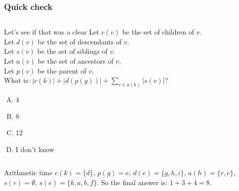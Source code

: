 \begin{frame}
	\frametitle{Quick check}
	
	\begin{columns}
		\pause
			\begin{block}{Let's see if that was a clear}
				Let $c(v)$ be the set of children of $v$.\\
				Let $d(v)$ be the set of descendants of $v$.\\
				Let $s(v)$ be the set of siblings of $v$.\\
				Let $a(v)$ be the set of ancestors of $v$.\\
				Let $p(v)$ be the parent of $v$.\\
				What is: $|c(k)| + |d(p(g))| + \sum\limits_{v \in a(h)} |s(v)|$?
				\begin{enumerate}[A.]
					\item 4
					\item 8
					\item 12
					\item I don't know
				\end{enumerate}
			\end{block}
	\end{columns}
	\pause
	\vspace{-5pt}
	\begin{block}{Arithmetic time}
		$c(k) = \{d\}$, $p(g) = e$, $d(e) = \{g,h,i\}$, $a(h) = \{r,e\}$, $s(r) = \emptyset$, $s(e) = \{k,a,b,f\}$. So the
		final answer is: $1+3+4=8$.
	\end{block}
\end{frame}


